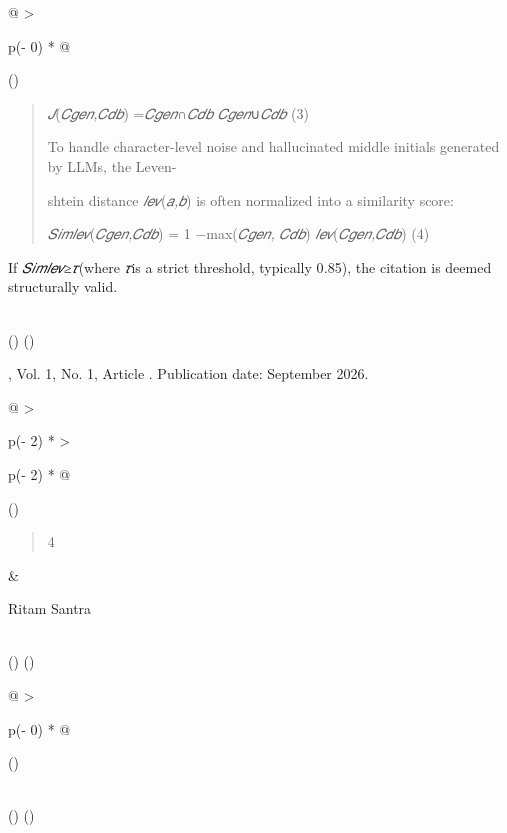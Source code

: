 \documentclass[
]{article}
\begin{document}
\begin{longtable}[]{@{}
  >{\raggedright\arraybackslash}p{(\columnwidth - 0\tabcolsep) * }@{}}
\toprule()
\begin{minipage}[b]{\linewidth}\raggedright
\begin{quote}
\emph{𝐽}(\emph{𝐶𝑔𝑒𝑛,𝐶𝑑𝑏}) =\textbar{}\emph{𝐶𝑔𝑒𝑛}∩\emph{𝐶𝑑𝑏}\textbar{}
\textbar{}\emph{𝐶𝑔𝑒𝑛}∪\emph{𝐶𝑑𝑏}\textbar{} (3)

To handle character-level noise and hallucinated middle initials
generated by LLMs, the Leven-

shtein distance \emph{𝑙𝑒𝑣}(\emph{𝑎,𝑏}) is often normalized into a
similarity score:

\emph{𝑆𝑖𝑚𝑙𝑒𝑣}(\emph{𝐶𝑔𝑒𝑛,𝐶𝑑𝑏}) = 1
−max(\textbar{}\emph{𝐶𝑔𝑒𝑛}\textbar{}\emph{,}
\textbar{}\emph{𝐶𝑑𝑏}\textbar) \emph{𝑙𝑒𝑣}(\emph{𝐶𝑔𝑒𝑛,𝐶𝑑𝑏}) (4)
\end{quote}

If \emph{𝑆𝑖𝑚𝑙𝑒𝑣}≥\emph{𝜏}(where \emph{𝜏}is a strict threshold, typically
0\emph{.}85), the citation is deemed structurally valid.
\end{minipage} \\
\midrule()
\endhead
\bottomrule()
\end{longtable}

, Vol. 1, No. 1, Article . Publication date: September 2026.

\begin{longtable}[]{@{}
  >{\raggedright\arraybackslash}p{(\columnwidth - 2\tabcolsep) * }
  >{\raggedright\arraybackslash}p{(\columnwidth - 2\tabcolsep) * }@{}}
\toprule()
\begin{minipage}[b]{\linewidth}\raggedright
\begin{quote}
4
\end{quote}
\end{minipage} & \begin{minipage}[b]{\linewidth}\raggedright
Ritam Santra
\end{minipage} \\
\midrule()
\endhead
\bottomrule()
\end{longtable}

\begin{longtable}[]{@{}
  >{\raggedright\arraybackslash}p{(\columnwidth - 0\tabcolsep) * }@{}}
\toprule()
\begin{minipage}[b]{\linewidth}\raggedright
\end{minipage} \\
\midrule()
\endhead
\bottomrule()
\end{longtable}
\end{document}
